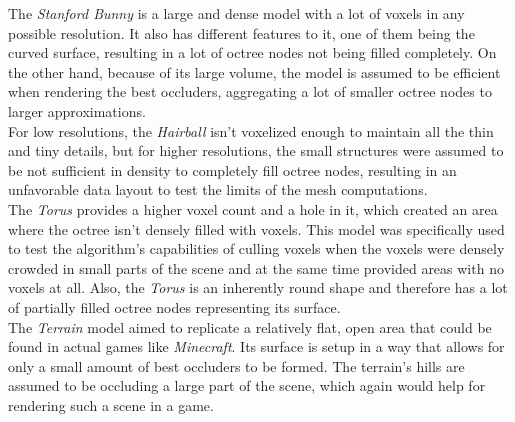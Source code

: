\noindent
The \emph{Stanford Bunny} is a large and dense model with a lot of voxels in any possible resolution.
It also has different features to it, one of them being the curved surface, resulting in a lot of octree 
nodes not being filled completely. On the other hand, because of its large volume, the model is assumed 
to be efficient when rendering the best occluders, aggregating a lot of smaller octree nodes to larger 
approximations. \\ 

\noindent
For low resolutions, the \emph{Hairball} isn't voxelized enough to maintain all the thin and tiny details, 
but for higher resolutions, the small structures were assumed to be not sufficient in density to completely
fill octree nodes, resulting in an unfavorable data layout to test the limits of the mesh computations. \\

\noindent
The \emph{Torus} provides a higher voxel count and a hole in it, which created an area where the 
octree isn't densely filled with voxels. This model was specifically used to test the algorithm's 
capabilities of culling voxels when the voxels were densely crowded in small parts of the scene and 
at the same time provided areas with no voxels at all. Also, the \emph{Torus} is an inherently round 
shape and therefore has a lot of partially filled octree nodes representing its surface. \\

\noindent
The \emph{Terrain} model aimed to replicate a relatively flat, open area that could be found in actual 
games like \emph{Minecraft}. Its surface is setup in a way that allows for only a small amount of best 
occluders to be formed. The terrain's hills are assumed to be occluding a large part of the scene, 
which again would help for rendering such a scene in a game.


%
%
%
%
%
%

